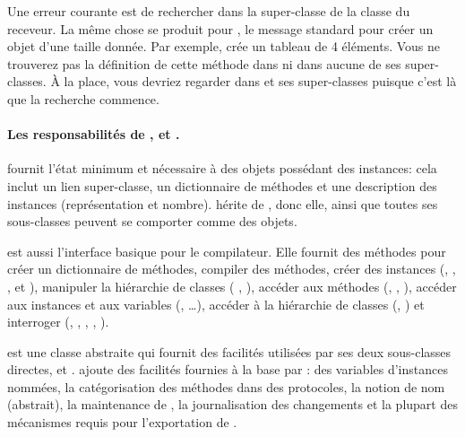 \documentclass[a4paper,10pt,twoside]{book}
\begin{document}
Une erreur courante est de rechercher  dans la super-classe de la classe du receveur.
La même chose se produit pour , le message standard pour créer un objet d'une taille donnée.
Par exemple,  crée un tableau de 4 éléments.
Vous ne trouverez pas la définition de cette méthode dans  ni 
dans aucune de ses super-classes. À la place, vous devriez regarder dans  et ses super-classes puisque c'est là que la recherche commence.


\paragraph{Les responsabilités de ,  et .}
 fournit l'état minimum et nécessaire à des objets possédant des instances: cela inclut un lien super-classe, un dictionnaire de méthodes et une description des instances (\ie représentation et nombre).
 hérite de , donc elle, ainsi que toutes ses sous-classes peuvent se comporter comme des objets. 

 est aussi l'interface basique pour le compilateur.
Elle fournit des méthodes pour créer un dictionnaire de méthodes, compiler des méthodes, créer des instances (\ie {}, , , et ),
manipuler la hiérarchie de classes (\ie
{} , %
 ), 
accéder aux méthodes (\ie {}, , ),
accéder aux instances et aux variables (\ie {}, \ldots),
accéder à la hiérarchie de classes (\ie {}, )
et interroger  (\ie {}, , , , ).

 est une classe abstraite qui fournit des facilités utilisées par ses deux sous-classes directes,   et .
 ajoute des facilités fournies à la base par :
des variables d'instances nommées,
la catégorisation des méthodes dans des protocoles,
la notion de nom (abstrait),
la maintenance de \changesets, la journalisation des changements
et la plupart des mécanismes requis pour l'exportation de \changesets.
\end{document}
